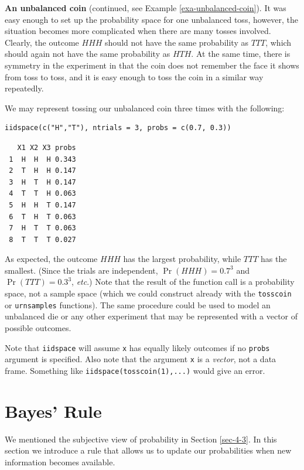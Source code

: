 \documentclass[captions=tableheading]{scrbook}
\begin{document}
\begin{example}
\textbf{An unbalanced coin} (continued, see Example \ref{exa-unbalanced-coin}). It was easy enough to set up the probability space for one unbalanced toss, however, the situation becomes more complicated when there are many tosses involved. Clearly, the outcome \(HHH\) should not have the same probability as \(TTT\), which should again not have the same probability as \(HTH\). At the same time, there is symmetry in the experiment in that the coin does not remember the face it shows from toss to toss, and it is easy enough to toss the coin in a similar way repeatedly.

We may represent tossing our unbalanced coin three times with the following: 


\begin{verbatim}
iidspace(c("H","T"), ntrials = 3, probs = c(0.7, 0.3))
\end{verbatim}

\begin{verbatim}
   X1 X2 X3 probs
 1  H  H  H 0.343
 2  T  H  H 0.147
 3  H  T  H 0.147
 4  T  T  H 0.063
 5  H  H  T 0.147
 6  T  H  T 0.063
 7  H  T  T 0.063
 8  T  T  T 0.027
\end{verbatim}

As expected, the outcome \(HHH\) has the largest probability, while \(TTT\) has the smallest. (Since the trials are independent, \(\Pr(HHH)=0.7^{3}\) and \(\Pr(TTT)=0.3^{3}\), \emph{etc}.) Note that the result of the function call is a probability space, not a sample space (which we could construct already with the \texttt{tosscoin} or \texttt{urnsamples} functions). The same procedure could be used to model an unbalanced die or any other experiment that may be represented with a vector of possible outcomes.

\end{example}

Note that \texttt{iidspace} will assume \texttt{x} has equally likely outcomes if no \texttt{probs} argument is specified. Also note that the argument \texttt{x} is a \emph{vector}, not a data frame. Something like \texttt{iidspace(tosscoin(1),...)} would give an error.
\section{Bayes' Rule}
\label{sec-4-8}
\label{sec-Bayes'-Rule}


We mentioned the subjective view of probability in Section \ref{sec-4-3}. In this section we introduce a rule that allows us to update our probabilities when new information becomes available. 
\end{document}
